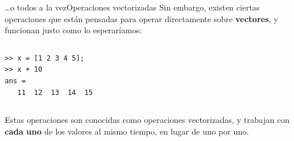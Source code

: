 \documentclass[spanish, c]{beamer}
\begin{document}
\begin{frame}[fragile]{\dots o todos a la vez}{Operaciones vectorizadas}
    Sin embargo, existen ciertas operaciones que están pensadas para operar directamente sobre \textbf{vectores}, y funcionan justo como lo esperaríamos:

    \bigskip

    \begin{columns}
        \begin{column}{0.95\linewidth}
            \begin{lstlisting}[title={Command Window}, numbers=none]
>> x = [1 2 3 4 5];
>> x + 10
ans =
   11  12  13  14  15
            \end{lstlisting}
        \end{column}
    \end{columns}

    \bigskip

    Estas operaciones son conocidas como \alert{operaciones vectorizadas}, y trabajan con \textbf{cada uno} de los valores al mismo tiempo, en lugar de uno por uno.
\end{frame}





\end{document}
